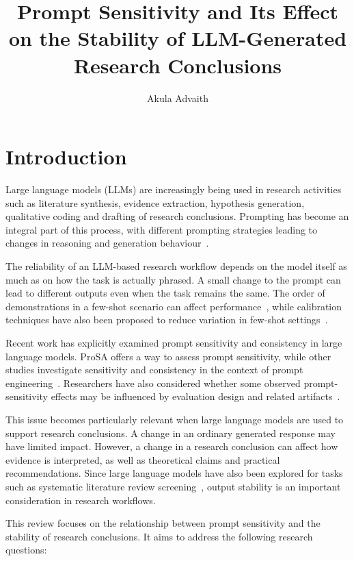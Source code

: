 \documentclass[acmsmall,screen,review]{acmart}
\title{Prompt Sensitivity and Its Effect on the Stability of LLM-Generated Research Conclusions}
\author{Akula Advaith}
\affiliation{%
  \institution{Indian Institute of Information Technology Allahabad}
  \city{Prayagraj}
  \country{India}}
\begin{document}
\maketitle

\section{Introduction}
\label{sec:introduction}

Large language models (LLMs) are increasingly being used in research activities such as literature synthesis, evidence extraction, hypothesis generation, qualitative coding and drafting of research conclusions. Prompting has become an integral part of this process, with different prompting strategies leading to changes in reasoning and generation behaviour~\cite{schulhoff2024,wei2022,kojima2022}.

The reliability of an LLM-based research workflow depends on the model itself as much as on how the task is actually phrased. A small change to the prompt can lead to different outputs even when the task remains the same. The order of demonstrations in a few-shot scenario can affect performance~\cite{lu2022}, while calibration techniques have also been proposed to reduce variation in few-shot settings~\cite{zhao2021}.

Recent work has explicitly examined prompt sensitivity and consistency in large language models. ProSA offers a way to assess prompt sensitivity, while other studies investigate sensitivity and consistency in the context of prompt engineering~\cite{zhuo2024,errica2025}. Researchers have also considered whether some observed prompt-sensitivity effects may be influenced by evaluation design and related artifacts~\cite{hua2025}.

This issue becomes particularly relevant when large language models are used to support research conclusions. A change in an ordinary generated response may have limited impact. However, a change in a research conclusion can affect how evidence is interpreted, as well as theoretical claims and practical recommendations. Since large language models have also been explored for tasks such as systematic literature review screening~\cite{han2025,strachan2024}, output stability is an important consideration in research workflows.

This review focuses on the relationship between prompt sensitivity and the stability of research conclusions. It aims to address the following research questions:
\end{document}
